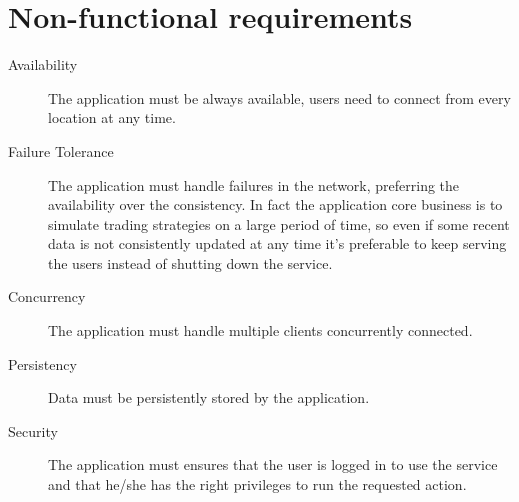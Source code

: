 \section{Non-functional requirements}\label{sec:nonfunctionalrequirements}

\begin{description}
	\item[Availability] The application must be always available, users need
		to connect from every location at any time.
	\item[Failure Tolerance] The application must handle failures in the
		network, preferring the availability over the consistency.  In
		fact the application core business is to simulate trading
		strategies on a large period of time, so even if some recent
		data is not consistently updated at any time it's preferable to
		keep serving the users instead of shutting down the service. 
	\item[Concurrency] The application must handle multiple clients
		concurrently connected.
	\item[Persistency] Data must be persistently stored by the application.
	\item[Security] The application must ensures that the user is logged in
		to use the service and that he/she has the right privileges to
		run the requested action.
\end{description}
